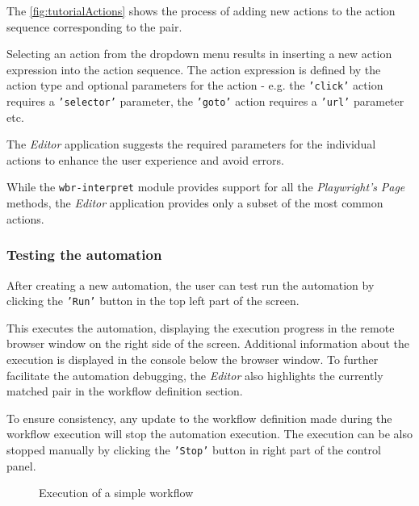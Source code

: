 The \autoref{fig:tutorialActions} shows the process of adding new actions to the action sequence corresponding to the pair.

Selecting an action from the dropdown menu results in inserting a new action expression into the action sequence.
The action expression is defined by the action type and optional parameters for the action - e.g. the \texttt{'click'} action requires a \texttt{'selector'} parameter,
the \texttt{'goto'} action requires a \texttt{'url'} parameter etc.

The \textit{Editor} application suggests the required parameters for the individual actions to enhance the user experience and avoid errors.

While the \texttt{wbr-interpret} module provides support for all the \textit{Playwright's} \textit{Page} methods, the \textit{Editor} application provides only a subset of the most common actions.

\subsubsection{Testing the automation}

After creating a new automation, the user can test run the automation by clicking the \texttt{'Run'} button in the top left part of the screen.

This executes the automation, displaying the execution progress in the remote browser window on the right side of the screen.
Additional information about the execution is displayed in the console below the browser window.
To further facilitate the automation debugging, the \textit{Editor} also highlights the currently matched pair in the workflow definition section.

To ensure consistency, any update to the workflow definition made during the workflow execution will stop the automation execution.
The execution can be also stopped manually by clicking the \texttt{'Stop'} button in right part of the control panel.

\begin{figure}[!h]
    \begin{center}
    \end{center}
    \caption{Execution of a simple workflow}
\end{figure}